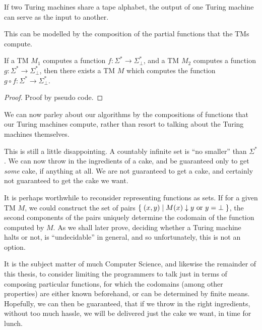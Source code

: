 





If two Turing machines share a tape alphabet, the output of one Turing machine
can serve as the input to another.

This can be modelled by the composition of the
partial functions that the TMs compute.

\begin{theorem} If a TM $M_1$ computes a function $f : \Sigma^* \rightarrow
\Sigma^*_\bot$, and a TM $M_2$ computes a function $g : \Sigma^* \rightarrow
\Sigma^*_\bot$, then there exists a TM $M$ which computes the function $g\circ
f : \Sigma^* \rightarrow \Sigma^*_\bot$.\end{theorem}

\begin{proof} Proof by pseudo code. \end{proof}

We can now parley about our algorithms by the compositions of functions that
our Turing machines compute, rather than resort to talking about the Turing
machines themselves.

This is still a little disappointing. A countably infinite set is ``no
smaller'' than $\Sigma^*$. We can now throw in the ingredients of a cake, and
be guaranteed only to get \emph{some} cake, if anything at all. We are not
guaranteed to get a cake, and certainly not guaranteed to get the cake we want.

It is perhaps worthwhile to reconsider representing functions as sets. If for a
given TM $M$, we could construct the set of pairs
$\mathopen{}\left\{\mathrel{}{\mathopen{}\left({x,y}\right)\mathclose{}\mathrel{}\mid\mathrel{}{\text{$M\mathopen{}\left({x}\right)\mathclose{}\downarrow y$ or $y=\bot$}}}\mathrel{}\right\}\mathclose{}$, the second
components of the pairs uniquely determine the codomain of the function
computed by $M$. As we shall later prove, deciding whether a Turing machine
halts or not, is ``undecidable'' in general, and so unfortunately, this is not
an option.

It is the subject matter of much Computer Science, and likewise the remainder
of this thesis, to consider limiting the programmers to talk just in terms of
composing particular functions, for which the codomains (among other
properties) are either known beforehand, or can be determined by finite means.
Hopefully, we can then be guaranteed, that if we throw in the right
ingredients, without too much hassle, we will be delivered just the cake we
want, in time for lunch.

